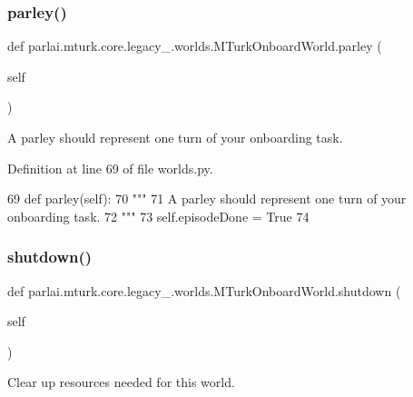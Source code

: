 \subsubsection{\texorpdfstring{parley()}{parley()}}
{\footnotesize\ttfamily def parlai.\+mturk.\+core.\+legacy\+\_.\+worlds.\+M\+Turk\+Onboard\+World.\+parley (\begin{DoxyParamCaption}\item[{}]{self }\end{DoxyParamCaption})}

\begin{DoxyVerb}A parley should represent one turn of your onboarding task.
\end{DoxyVerb}
 

Definition at line 69 of file worlds.\+py.


\begin{DoxyCode}
69     \textcolor{keyword}{def }parley(self):
70         \textcolor{stringliteral}{"""}
71 \textcolor{stringliteral}{        A parley should represent one turn of your onboarding task.}
72 \textcolor{stringliteral}{        """}
73         self.episodeDone = \textcolor{keyword}{True}
74 
\end{DoxyCode}
\mbox{\label{classparlai_1_1mturk_1_1core_1_1legacy__2018_1_1worlds_1_1MTurkOnboardWorld_aa21e33548d44bbc48c369ab571f72b0d}} 
\subsubsection{\texorpdfstring{shutdown()}{shutdown()}}
{\footnotesize\ttfamily def parlai.\+mturk.\+core.\+legacy\+\_.\+worlds.\+M\+Turk\+Onboard\+World.\+shutdown (\begin{DoxyParamCaption}\item[{}]{self }\end{DoxyParamCaption})}

\begin{DoxyVerb}Clear up resources needed for this world.
\end{DoxyVerb}
 


